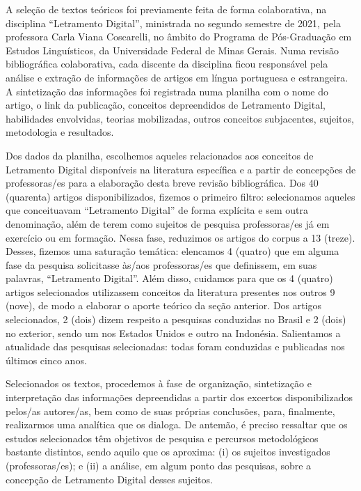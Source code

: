 \documentclass[portuguese]{textolivre}
\begin{document}
A seleção de textos teóricos foi previamente feita de forma colaborativa, na disciplina “Letramento Digital”, ministrada no segundo semestre de 2021, pela professora Carla Viana Coscarelli, no âmbito do Programa de Pós-Graduação em Estudos Linguísticos, da Universidade Federal de Minas Gerais. Numa revisão bibliográfica colaborativa, cada discente da disciplina ficou responsável pela análise e extração de informações de artigos em língua portuguesa e estrangeira. A sintetização das informações foi registrada numa planilha com o nome do artigo, o link da publicação, conceitos depreendidos de Letramento Digital, habilidades envolvidas, teorias mobilizadas, outros conceitos subjacentes, sujeitos, metodologia e resultados.

Dos dados da planilha, escolhemos aqueles relacionados aos conceitos de Letramento Digital disponíveis na literatura específica e a partir de concepções de professoras/es para a elaboração desta breve revisão bibliográfica. Dos 40 (quarenta) artigos disponibilizados, fizemos o primeiro filtro: selecionamos aqueles que conceituavam “Letramento Digital” de forma explícita e sem outra denominação, além de terem como sujeitos de pesquisa professoras/es já em exercício ou em formação. Nessa fase, reduzimos os artigos do corpus a 13 (treze). Desses, fizemos uma saturação temática: elencamos 4 (quatro) que em alguma fase da pesquisa solicitasse às/aos professoras/es que definissem, em suas palavras, “Letramento Digital”. Além disso, cuidamos para que os 4 (quatro) artigos selecionados utilizassem conceitos da literatura presentes nos outros 9 (nove), de modo a elaborar o aporte teórico da seção anterior. Dos artigos selecionados, 2 (dois) dizem respeito a pesquisas conduzidas no Brasil e 2 (dois) no exterior, sendo um nos Estados Unidos e outro na Indonésia. Salientamos a atualidade das pesquisas selecionadas: todas foram conduzidas e publicadas nos últimos cinco anos.

Selecionados os textos, procedemos à fase de organização, sintetização e interpretação das informações depreendidas a partir dos excertos disponibilizados pelos/as autores/as, bem como de suas próprias conclusões, para, finalmente, realizarmos uma analítica que os dialoga. De antemão, é preciso ressaltar que os estudos selecionados têm objetivos de pesquisa e percursos metodológicos bastante distintos, sendo aquilo que os aproxima: (i) os sujeitos investigados (professoras/es); e (ii) a análise, em algum ponto das pesquisas, sobre a concepção de Letramento Digital desses sujeitos.
\end{document}
